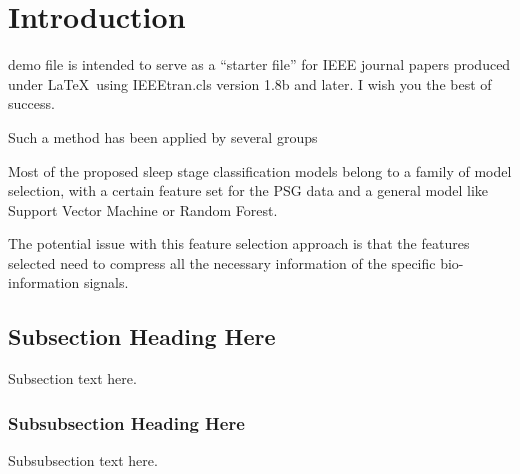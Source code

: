 \documentclass[journal]{IEEEtran}
\begin{document}
\section{Introduction}
% 
% 
% 
% 
 demo file is intended to serve as a ``starter file''
for IEEE journal papers produced under \LaTeX\ using
IEEEtran.cls version 1.8b and  later.
I wish you the best of success.

Such a method has been applied by several groups 

Most of the proposed sleep stage classification models belong to a family of model selection, with a certain feature set for the PSG data and a general model like Support Vector Machine or Random Forest.

The potential issue with this feature selection approach is that the features selected need to compress all the necessary information of the specific bio-information signals.

\subsection{Subsection Heading Here}
Subsection text here.


\subsubsection{Subsubsection Heading Here}
Subsubsection text here.
\end{document}
